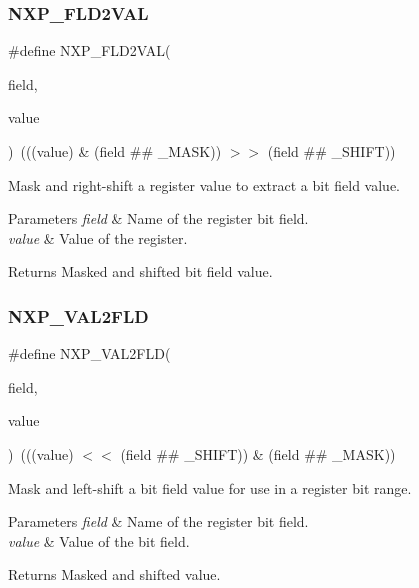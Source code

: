 \subsubsection{\texorpdfstring{NXP\_FLD2VAL}{NXP\_FLD2VAL}}
{\footnotesize\ttfamily \#define N\+X\+P\+\_\+\+F\+L\+D2\+V\+AL(\begin{DoxyParamCaption}\item[{}]{field,  }\item[{}]{value }\end{DoxyParamCaption})~(((value) \& (field \#\# \+\_\+\+M\+A\+SK)) $>$$>$ (field \#\# \+\_\+\+S\+H\+I\+FT))}



Mask and right-\/shift a register value to extract a bit field value. 


\begin{DoxyParams}{Parameters}
{\em field} & Name of the register bit field. \\
\hline
{\em value} & Value of the register. \\
\hline
\end{DoxyParams}
\begin{DoxyReturn}{Returns}
Masked and shifted bit field value. 
\end{DoxyReturn}
\mbox{\label{group___bit___field___generic___macros_ga174e73af51fd6bf7974359c28ec60c0d}} 
\subsubsection{\texorpdfstring{NXP\_VAL2FLD}{NXP\_VAL2FLD}}
{\footnotesize\ttfamily \#define N\+X\+P\+\_\+\+V\+A\+L2\+F\+LD(\begin{DoxyParamCaption}\item[{}]{field,  }\item[{}]{value }\end{DoxyParamCaption})~(((value) $<$$<$ (field \#\# \+\_\+\+S\+H\+I\+FT)) \& (field \#\# \+\_\+\+M\+A\+SK))}



Mask and left-\/shift a bit field value for use in a register bit range. 


\begin{DoxyParams}{Parameters}
{\em field} & Name of the register bit field. \\
\hline
{\em value} & Value of the bit field. \\
\hline
\end{DoxyParams}
\begin{DoxyReturn}{Returns}
Masked and shifted value. 
\end{DoxyReturn}
